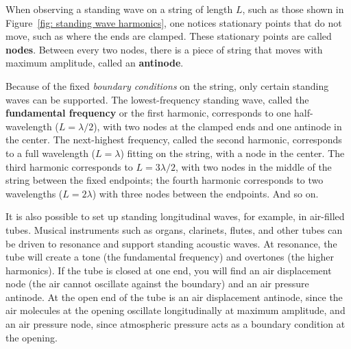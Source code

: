 \documentclass[addpoints]{physlabs}
\begin{document}
\begin{labsection}
\begin{theory}
    When observing a standing wave on a string of length $L$, such as those shown in Figure~\ref{fig: standing wave harmonics}, one notices stationary points that do not move, such as where the ends are clamped. These stationary points are called \textbf{nodes}. Between every two nodes, there is a piece of string that moves with maximum amplitude, called an \textbf{antinode}.
    
    Because of the fixed \textsl{boundary conditions} on the string, only certain standing waves can be supported. The lowest-frequency standing wave, called the \textbf{fundamental frequency} or the first harmonic, corresponds to one half-wavelength ($L=\lambda/2$), with two nodes at the clamped ends and one antinode in the center. The next-highest frequency, called the second harmonic, corresponds to a full wavelength ($L=\lambda$) fitting on the string, with a node in the center. The third harmonic corresponds to $L=3\lambda/2$, with two nodes in the middle of the string between the fixed endpoints; the fourth harmonic corresponds to two wavelengths ($L=2\lambda$) with three nodes between the endpoints. And so on.

    It is also possible to set up standing longitudinal waves, for example, in air-filled tubes. Musical instruments such as organs, clarinets, flutes, and other tubes can be driven to resonance and support standing acoustic waves. At resonance, the tube will create a tone (the fundamental frequency) and overtones (the higher harmonics). If the tube is closed at one end, you will find an air displacement node (the air cannot oscillate against the boundary) and an air pressure antinode. At the open end of the tube is an air displacement antinode, since the air molecules at the opening oscillate longitudinally at maximum amplitude, and an air pressure node, since atmospheric pressure acts as a boundary condition at the opening.
    
    
\end{theory}


\end{labsection}
\end{document}
